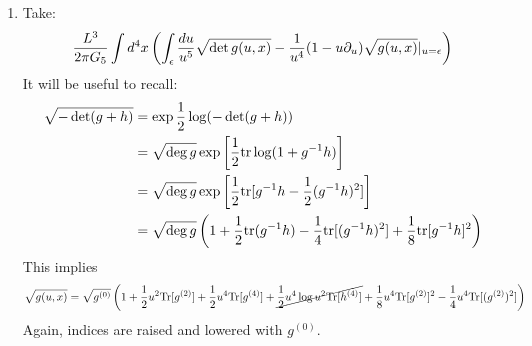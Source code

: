 \documentclass[11pt, class=article, crop=false]{standalone}
\begin{document}
\begin{enumerate}
	\item Take:
	\begin{equation}\label{eq:gravonshell}
				\frac{L^3}{2 \pi G_5} \int d^4 x\left( \int_{\epsilon} \frac{du}{u^5} \sqrt{\det g(u, x)} - \frac{1}{u^4} (1 - u \partial_u) \sqrt{g(u, x)}|_{u = \epsilon} \right)
	\end{equation}
	It will be useful to recall:
	\[
	\begin{aligned}
				\sqrt{-\det(g+h)}& = \exp \frac12 \log (-\det(g+h))\\& = \sqrt{\deg g} \exp\left[ \frac12 \mathrm{tr} \log(1 + g^{-1} h) \right] \\&= \sqrt{\deg g} \exp\left[ \frac12 \mathrm{tr} [g^{-1} h - \frac12 (g^{-1} h)^2] \right]\\& = \sqrt{\deg g}\left(1 + \frac12 \mathrm{tr} (g^{-1} h) - \frac14 \mathrm{tr}[(g^{-1} h)^2] + \frac18 \mathrm{tr}[g^{-1} h]^2 \right)
	\end{aligned}
	\]
	This implies
	\[
		\sqrt{g(u, x)} = \sqrt{g^{(0)}} \left(1 + \frac12 u^2 \mathrm{Tr}[g^{(2)}] + \frac12 u^4 \mathrm{Tr}[g^{(4)}] + \cancel{ \frac12 u^4 \log u^2 \mathrm{Tr}[h^{(4)}]} + \frac18 u^4 \mathrm{Tr}[g^{(2)}]^2  - \frac14 u^4 \mathrm{Tr}[(g^{(2)})^2 ] \right)
	\]
	Again, indices are raised and lowered with $g^{(0)}$.
	

\end{enumerate}
\end{document}
